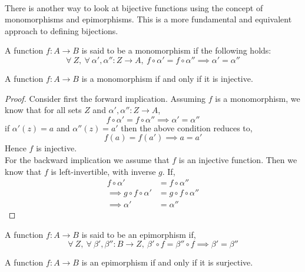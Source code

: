 \paragraph{} There is another way to look at bijective functions using the concept of monomorphisms and epimorphisms. This is a more fundamental and equivalent approach to defining bijections.
\begin{definition}
  A function $f:A\to B$ is said to be a monomorphism if the following holds:
  \[\forall\ Z,\ \forall\ \alpha', \alpha'':Z\to A,\ f\circ \alpha' = f\circ \alpha'' \implies \alpha' = \alpha''\]
\end{definition}
\begin{proposition}
  A function $f:A\to B$ is a monomorphism if and only if it is injective.
\end{proposition}
\begin{proof}
    Consider first the forward implication. Assuming $f$ is a monomorphism, we know that for all sets $Z$ and $\alpha', \alpha'':Z\to A$,
    \[f\circ\alpha' = f\circ\alpha'' \implies \alpha' = \alpha''\]
    if $\alpha'(z) = a$ and $\alpha''(z) = a'$ then the above condition reduces to,
    \[f(a) = f(a') \implies a = a'\]
    Hence $f$ is injective.\\

    For the backward implication we assume that $f$ is an injective function. Then we know that $f$ is left-invertible, with inverse $g$. If,
    \begin{align*}
      f\circ\alpha'&=f\circ\alpha''\\
      \implies g\circ f\circ\alpha'&=g\circ f\circ\alpha''\\
      \implies \alpha' &= \alpha''
    \end{align*}
\end{proof}
\begin{definition}
  A function $f:A\to B$ is said to be an epimorphism if,
  \[\forall\ Z,\ \forall\ \beta',\beta'':B\to Z,\ \beta'\circ f = \beta''\circ f \implies \beta' = \beta''\]
\end{definition}
\begin{proposition}
  A function $f:A\to B$ is an epimorphism if and only if it is surjective.
\end{proposition}
